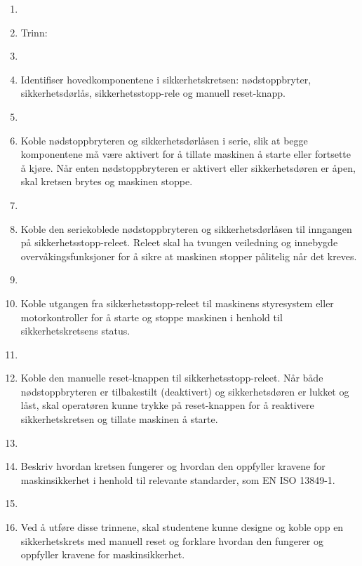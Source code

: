 \documentclass[12pt,a4paper]{article}
\begin{document}
\begin{enumerate}
	\item 
	\item Trinn:
	\item 
	\item Identifiser hovedkomponentene i sikkerhetskretsen: nødstoppbryter, sikkerhetsdørlås, sikkerhetsstopp-rele og manuell reset-knapp.
	\item 
	\item Koble nødstoppbryteren og sikkerhetsdørlåsen i serie, slik at begge komponentene må være aktivert for å tillate maskinen å starte eller fortsette å kjøre. Når enten nødstoppbryteren er aktivert eller sikkerhetsdøren er åpen, skal kretsen brytes og maskinen stoppe.
	\item 
	\item Koble den seriekoblede nødstoppbryteren og sikkerhetsdørlåsen til inngangen på sikkerhetsstopp-releet. Releet skal ha tvungen veiledning og innebygde overvåkingsfunksjoner for å sikre at maskinen stopper pålitelig når det kreves.
	\item 
	\item Koble utgangen fra sikkerhetsstopp-releet til maskinens styresystem eller motorkontroller for å starte og stoppe maskinen i henhold til sikkerhetskretsens status.
	\item 
	\item Koble den manuelle reset-knappen til sikkerhetsstopp-releet. Når både nødstoppbryteren er tilbakestilt (deaktivert) og sikkerhetsdøren er lukket og låst, skal operatøren kunne trykke på reset-knappen for å reaktivere sikkerhetskretsen og tillate maskinen å starte.
	\item 
	\item Beskriv hvordan kretsen fungerer og hvordan den oppfyller kravene for maskinsikkerhet i henhold til relevante standarder, som EN ISO 13849-1.
	\item 
	\item Ved å utføre disse trinnene, skal studentene kunne designe og koble opp en sikkerhetskrets med manuell reset og forklare hvordan den fungerer og oppfyller kravene for maskinsikkerhet.
\end{enumerate}
\end{document}

